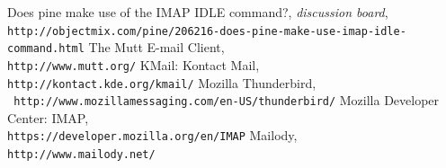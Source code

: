 \documentclass[12pt,notitlepage]{report}
\begin{document}
\begin{thebibliography}{99}
    Does pine make use of the IMAP IDLE command?, {\em
        discussion board}, \\
        {\tt http://objectmix.com/pine/206216-does-pine-make-use-imap-idle-command.html}
    The Mutt E-mail Client, \\
        {\tt http://www.mutt.org/}
    KMail: Kontact Mail, \\{\tt http://kontact.kde.org/kmail/}
    Mozilla Thunderbird, \\{\tt
        http://www.mozillamessaging.com/en-US/thunderbird/}
    Mozilla Developer Center: IMAP, \\
        {\tt https://developer.mozilla.org/en/IMAP}
    Mailody, \\{\tt http://www.mailody.net/}
\end{thebibliography}
\end{document}
